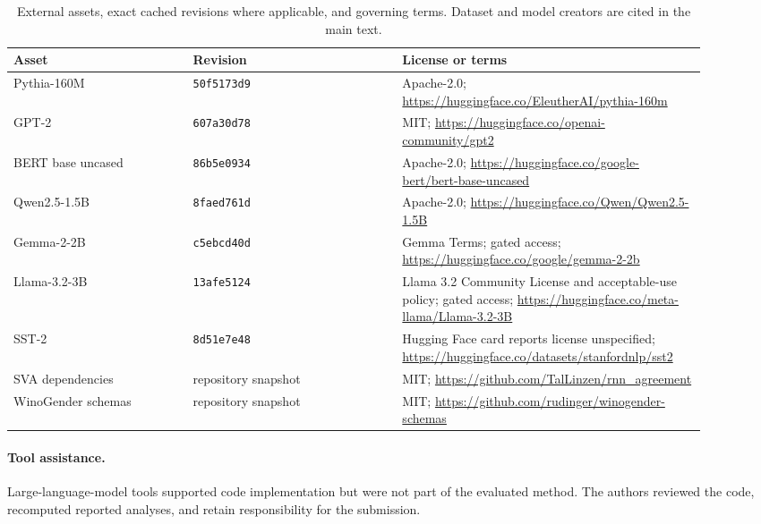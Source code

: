 \documentclass{article}
\begin{document}
\begin{table}[ht]
\centering
\scriptsize
\setlength{\tabcolsep}{3pt}
\begin{tabular}{p{0.24\linewidth}p{0.28\linewidth}p{0.38\linewidth}}
\toprule
Asset & Revision & License or terms \\
\midrule
Pythia-160M & \texttt{50f5173d9} & Apache-2.0; \url{https://huggingface.co/EleutherAI/pythia-160m} \\
GPT-2 & \texttt{607a30d78} & MIT; \url{https://huggingface.co/openai-community/gpt2} \\
BERT base uncased & \texttt{86b5e0934} & Apache-2.0; \url{https://huggingface.co/google-bert/bert-base-uncased} \\
Qwen2.5-1.5B & \texttt{8faed761d} & Apache-2.0; \url{https://huggingface.co/Qwen/Qwen2.5-1.5B} \\
Gemma-2-2B & \texttt{c5ebcd40d} & Gemma Terms; gated access; \url{https://huggingface.co/google/gemma-2-2b} \\
Llama-3.2-3B & \texttt{13afe5124} & Llama 3.2 Community License and acceptable-use policy; gated access; \url{https://huggingface.co/meta-llama/Llama-3.2-3B} \\
SST-2 & \texttt{8d51e7e48} & Hugging Face card reports license unspecified; \url{https://huggingface.co/datasets/stanfordnlp/sst2} \\
SVA dependencies & repository snapshot & MIT; \url{https://github.com/TalLinzen/rnn_agreement} \\
WinoGender schemas & repository snapshot & MIT; \url{https://github.com/rudinger/winogender-schemas} \\
\bottomrule
\end{tabular}
\caption{External assets, exact cached revisions where applicable, and governing terms. Dataset and model creators are cited in the main text.}
\label{tab:assets}
\end{table}

\paragraph{Tool assistance.}
Large-language-model tools supported code implementation but were not part of the evaluated method. The authors reviewed the code, recomputed reported analyses, and retain responsibility for the submission.

\clearpage

\end{document}

